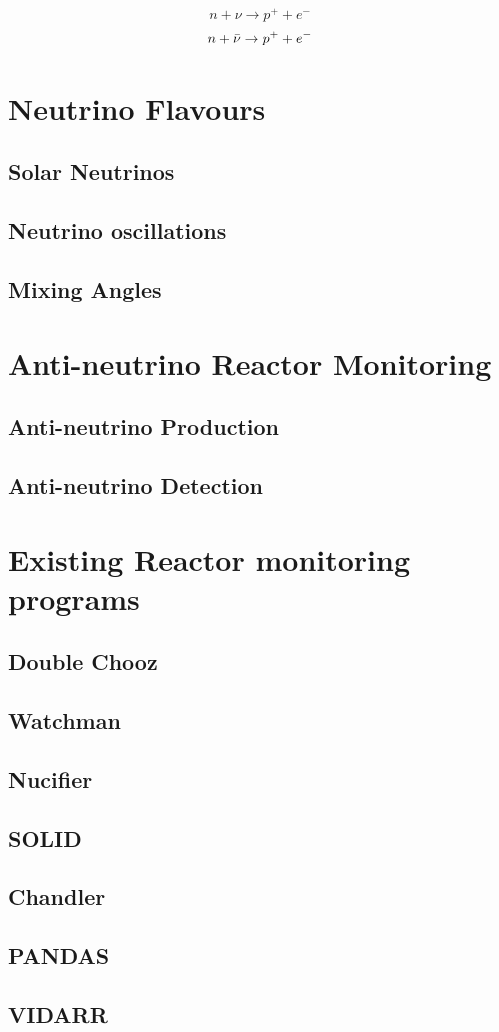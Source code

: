 \documentclass[12pt,a4paper]{article}
\begin{document}
\begin{equation}
    n + \nu \rightarrow p^+ + e^-
    \label{no_lepNo_dirac_nu_capture}
\end{equation}
\begin{equation}
    n + \Bar{\nu} \rightarrow p^+ + e^-
    \label{no_lepNo_maj_nu_capture}
\end{equation}

\section{Neutrino Flavours}
\subsection{Solar Neutrinos}
\subsection{Neutrino oscillations} \label{section_neutrino_oscillations}
\subsection{Mixing Angles}

\section{Anti-neutrino Reactor Monitoring}
\subsection{Anti-neutrino Production}
\subsection{Anti-neutrino Detection}

\section{Existing Reactor monitoring programs}
\subsection{Double Chooz}
\subsection{Watchman}
\subsection{Nucifier}
\subsection{SOLID}
\subsection{Chandler}
\subsection{PANDAS}
\subsection{VIDARR}

 

\end{document}
